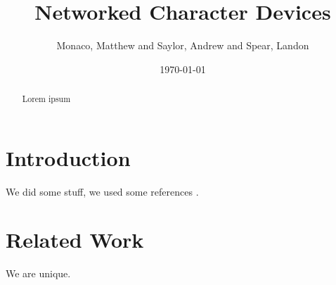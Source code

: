 \documentclass{article}
\begin{document}
\title{Networked Character Devices}
\author{Monaco, Matthew and Saylor, Andrew and Spear, Landon}
\date{\today}

\maketitle

\begin{abstract}
Lorem ipsum
\end{abstract}

\section{Introduction}

We did some stuff, we used some references \cite{ldd3}.

\section{Related Work}

We are unique.


\end{document}
